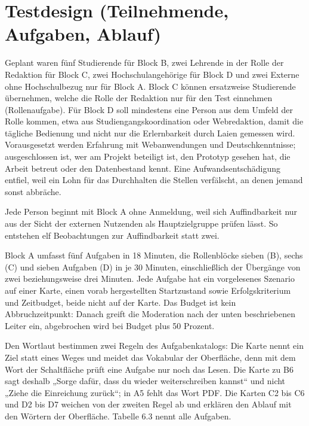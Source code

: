 \section{Testdesign (Teilnehmende, Aufgaben, Ablauf)}
\label{sec:testdesign}

Geplant waren fünf Studierende für Block B, zwei Lehrende in der Rolle der Redaktion für Block C, zwei Hochschulangehörige für Block D und zwei Externe ohne Hochschulbezug nur für Block A. Block C können ersatzweise Studierende übernehmen, welche die Rolle der Redaktion nur für den Test einnehmen (Rollenaufgabe). Für Block D soll mindestens eine Person aus dem Umfeld der Rolle kommen, etwa aus Studiengangskoordination oder Webredaktion, damit die tägliche Bedienung und nicht nur die Erlernbarkeit durch Laien gemessen wird. Vorausgesetzt werden Erfahrung mit Webanwendungen und Deutschkenntnisse; ausgeschlossen ist, wer am Projekt beteiligt ist, den Prototyp gesehen hat, die Arbeit betreut oder den Datenbestand kennt. Eine Aufwandsentschädigung entfiel, weil ein Lohn für das Durchhalten die Stellen verfälscht, an denen jemand sonst abbräche.

Jede Person beginnt mit Block A ohne Anmeldung, weil sich Auffindbarkeit nur aus der Sicht der externen Nutzenden als Hauptzielgruppe prüfen lässt. So entstehen elf Beobachtungen zur Auffindbarkeit statt zwei.

Block A umfasst fünf Aufgaben in 18 Minuten, die Rollenblöcke sieben (B), sechs (C) und sieben Aufgaben (D) in je 30 Minuten, einschließlich der Übergänge von zwei beziehungsweise drei Minuten. Jede Aufgabe hat ein vorgelesenes Szenario auf einer Karte, einen vorab hergestellten Startzustand sowie Erfolgskriterium und Zeitbudget, beide nicht auf der Karte. Das Budget ist kein Abbruchzeitpunkt: Danach greift die Moderation nach der unten beschriebenen Leiter ein, abgebrochen wird bei Budget plus 50 Prozent.

Den Wortlaut bestimmen zwei Regeln des Aufgabenkatalogs: Die Karte nennt ein Ziel statt eines Weges und meidet das Vokabular der Oberfläche, denn mit dem Wort der Schaltfläche prüft eine Aufgabe nur noch das Lesen. Die Karte zu B6 sagt deshalb „Sorge dafür, dass du wieder weiterschreiben kannst“ und nicht „Ziehe die Einreichung zurück“; in A5 fehlt das Wort PDF. Die Karten C2 bis C6 und D2 bis D7 weichen von der zweiten Regel ab und erklären den Ablauf mit den Wörtern der Oberfläche. Tabelle 6.3 nennt alle Aufgaben.

